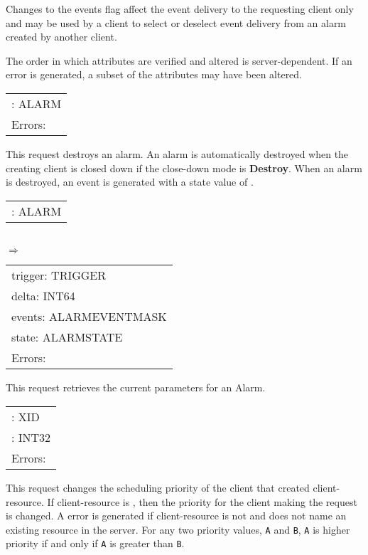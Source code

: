 \begin{description}
Changes to the events flag affect the event delivery to the requesting
client only and may be used by a client to select or deselect event delivery
from an alarm created by another client.

The order in which attributes are verified and altered is
server-dependent.  If an error is generated, a subset of the
attributes may have been altered.


\begin{tabular}{l}
	\param{alarm}: ALARM\\[5pt] 	Errors: \error{Alarm}
\end{tabular}

This request destroys an alarm. An alarm is automatically destroyed
when the creating client is closed down if the close-down mode is {\bf
Destroy}. When an alarm is destroyed, an  event is
generated with a state value of .


\begin{tabular}{l}
	\param{alarm}: ALARM\\
\end{tabular}\\
$\Rightarrow$\\
\begin{tabular}{l}
	trigger: TRIGGER\\
	delta: INT64\\
	events: ALARMEVENTMASK\\
	state: ALARMSTATE\\[5pt]
	Errors: \error{Alarm}
\end{tabular}

This request retrieves the current parameters for an Alarm.


\begin{tabular}{l}
	\param{client-resource}: XID\\
	\param{priority}: INT32\\[5pt]
	Errors: \error{Match}
\end{tabular}

This request changes the scheduling priority of the client that created
client-resource. If client-resource is , then the
priority for the client making the request is changed. A  error
is generated if client-resource is not  and does not name
an existing resource in the server.  For any two priority values,
{\tt A} and {\tt B}, {\tt A} is higher priority if and only if {\tt A} is
greater than {\tt B}.


\end{description}
